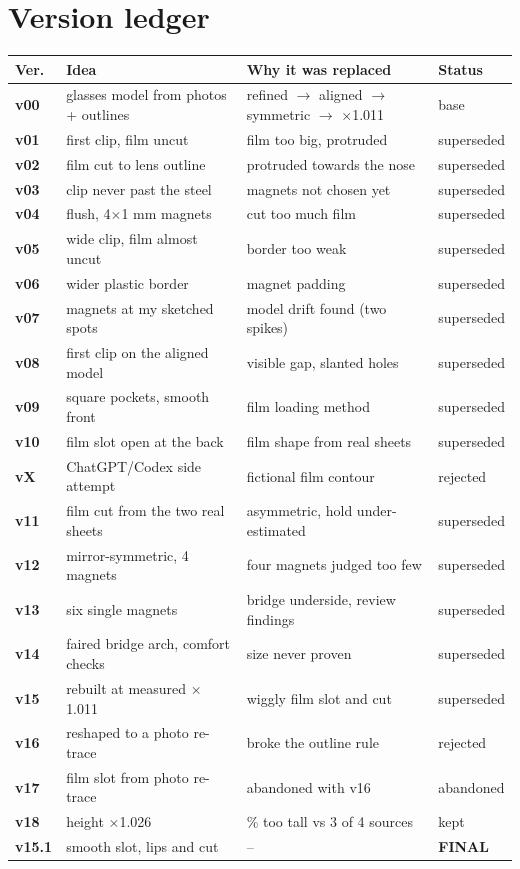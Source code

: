 \documentclass[10pt,a4paper,oneside]{article}
\begin{document}
\appendix
{}\section{Version ledger}
\small
\begin{tabularx}{\linewidth}{@{}>{\sffamily\bfseries}p{1.1cm}>{\raggedright\arraybackslash}p{5.6cm}>{\raggedright\arraybackslash}X>{\sffamily\scriptsize}p{1.9cm}@{}}
\toprule
Ver. & Idea & Why it was replaced & Status \\ \midrule
v00 & glasses model from photos + outlines & refined $\to$ aligned $\to$ symmetric $\to$ $\times$1.011 & base \\
v01 & first clip, film uncut & film too big, protruded & superseded \\
v02 & film cut to lens outline & protruded towards the nose & superseded \\
v03 & clip never past the steel & magnets not chosen yet & superseded \\
v04 & flush, 4$\times$1 mm magnets & cut too much film & superseded \\
v05 & wide clip, film almost uncut & border too weak & superseded \\
v06 & wider plastic border & magnet padding & superseded \\
v07 & magnets at my sketched spots & model drift found (two spikes) & superseded \\
v08 & first clip on the aligned model & visible gap, slanted holes & superseded \\
v09 & square pockets, smooth front & film loading method & superseded \\
v10 & film slot open at the back & film shape from real sheets & superseded \\
vX & ChatGPT/Codex side attempt & fictional film contour & rejected \\
v11 & film cut from the two real sheets & asymmetric, hold under-estimated & superseded \\
v12 & mirror-symmetric, 4 magnets & four magnets judged too few & superseded \\
v13 & six single magnets & bridge underside, review findings & superseded \\
v14 & faired bridge arch, comfort checks & size never proven & superseded \\
v15 & rebuilt at measured $\times$1.011 & wiggly film slot and cut & superseded \\
v16 & reshaped to a photo re-trace & broke the outline rule & rejected \\
v17 & film slot from photo re-trace & abandoned with v16 & abandoned \\
v18 & height $\times$1.026 & 1.3\% too tall vs 3 of 4 sources & kept \\
\rowcolor{teal!10} v15.1 & smooth slot, lips and cut & -- & \textbf{FINAL} \\ \bottomrule
\end{tabularx}
\normalsize
\end{document}
